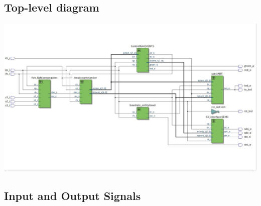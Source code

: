 \documentclass{article}
\begin{document}
\begin{center}
\section{Top-level diagram}
\vspace{1 cm}
\includegraphics[width=17cm]{top.JPG}
\end{center}
\newpage
\begin{center}
\subsection{Input and Output Signals}
    
\end{center}
\end{document}
